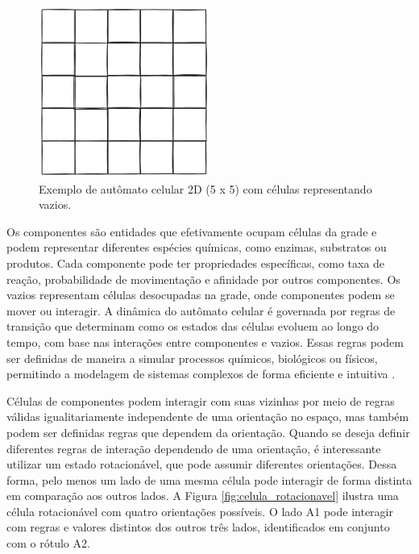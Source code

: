 \documentclass[12pt,oneside]{report}
\begin{document}
\begin{figure}[H]
    \centering
    \includegraphics[width=0.5\textwidth]{img/grade_2d.png}
    \caption{\small Exemplo de autômato celular 2D (5 x 5) com células representando vazios.}
    \label{fig:grade_2d}
\end{figure}

Os componentes são entidades que efetivamente ocupam células da grade e podem representar diferentes espécies químicas, como enzimas, substratos ou produtos. Cada componente pode ter propriedades específicas, como taxa de reação, probabilidade de movimentação e afinidade por outros componentes. Os vazios representam células desocupadas na grade, onde componentes podem se mover ou interagir. A dinâmica do autômato celular é governada por regras de transição que determinam como os estados das células evoluem ao longo do tempo, com base nas interações entre componentes e vazios. Essas regras podem ser definidas de maneira a simular processos químicos, biológicos ou físicos, permitindo a modelagem de sistemas complexos de forma eficiente e intuitiva \cite{kier2005}.

Células de componentes podem interagir com suas vizinhas por meio de regras válidas igualitariamente independente de uma orientação no espaço, mas também podem ser definidas regras que dependem da orientação. Quando se deseja definir diferentes regras de interação dependendo de uma orientação, é interessante utilizar um estado rotacionável, que pode assumir diferentes orientações. Dessa forma, pelo menos um lado de uma mesma célula pode interagir de forma distinta em comparação aos outros lados. A Figura \ref{fig:celula_rotacionavel} ilustra uma célula rotacionável com quatro orientações possíveis. O lado A1 pode interagir com regras e valores distintos dos outros três lados, identificados em conjunto com o rótulo A2.
\end{document}
